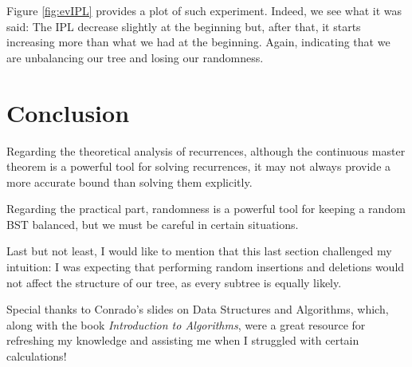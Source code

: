 Figure \ref{fig:evIPL} provides a plot of such experiment. Indeed, we see what it was said: The IPL decrease slightly at the beginning but, after that, it starts increasing more than what we had at the beginning. Again, indicating that we are unbalancing our tree and losing our randomness.


\section{Conclusion}
Regarding the theoretical analysis of recurrences, although the continuous master theorem is a powerful tool for solving recurrences, it may not always provide a more accurate bound than solving them explicitly.

Regarding the practical part, randomness is a powerful tool for keeping a random BST balanced, but we must be careful in certain situations.

Last but not least, I would like to mention that this last section challenged my intuition: I was expecting that performing random insertions and deletions would not affect the structure of our tree, as every subtree is equally likely.

Special thanks to Conrado's slides on Data Structures and Algorithms, which, along with the book \textit{Introduction to Algorithms}, were a great resource for refreshing my knowledge and assisting me when I struggled with certain calculations!
